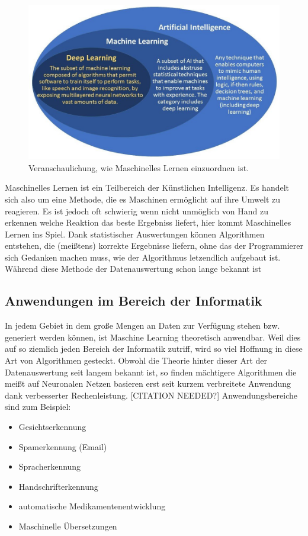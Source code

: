 \documentclass{thesisclass}
\begin{document}
\begin{figure}[h!]
  \center
  \includegraphics[width=\textwidth]{images/machineLearningInAI.jpg}
  \caption{Veranschaulichung, wie Maschinelles Lernen einzuordnen ist. \cite{machineLearning1}}
  \label{fig:Veranschaulichung, wie Maschinelles Lernen einzuordnen ist.}
\end{figure}

Maschinelles Lernen ist ein Teilbereich der Künstlichen Intelligenz. Es handelt sich also um eine Methode, die es Maschinen ermöglicht auf ihre Umwelt zu reagieren. Es ist jedoch oft schwierig wenn nicht unmöglich von Hand zu erkennen welche Reaktion das beste Ergebniss liefert, hier kommt Maschinelles Lernen ins Spiel. Dank statistischer Auswertungen können Algorithmen entstehen, die (meißtens) korrekte Ergebnisse liefern, ohne das der Programmierer sich Gedanken machen muss, wie der Algorithmus letzendlich aufgebaut ist. \newline
Während diese Methode der Datenauswertung schon lange bekannt ist  

\subsection{Anwendungen im Bereich der Informatik}
	In jedem Gebiet in dem große Mengen an Daten zur Verfügung stehen bzw. generiert werden können, ist Maschine Learning theoretisch anwendbar. Weil dies auf so ziemlich jeden Bereich der Informatik zutriff, wird so viel Hoffnung in diese Art von Algorithmen gesteckt. \newline
Obwohl die Theorie hinter dieser Art der Datenauswertung seit langem bekannt ist, so finden mächtigere Algorithmen die meißt auf Neuronalen Netzen basieren erst seit kurzem verbreitete Anwendung dank verbesserter Rechenleistung. [CITATION NEEDED?]\newline
	\newline Anwendungsbereiche sind zum Beispiel:
\begin{itemize}
	\item Gesichtserkennung
	\item Spamerkennung (Email)
	\item Spracherkennung
	\item Handschrifterkennung
	\item automatische Medikamentenentwicklung
	\item Maschinelle Übersetzungen
\end{itemize}
\end{document}
